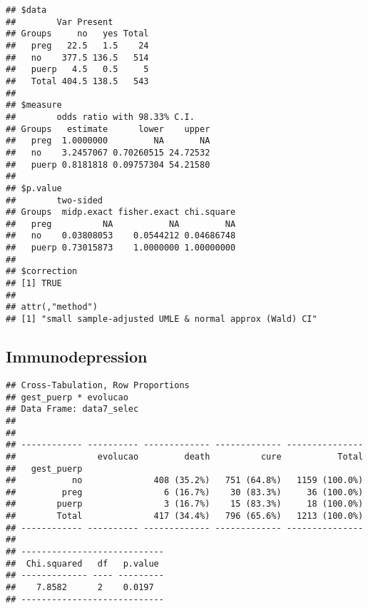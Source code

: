 \documentclass[
]{article}
\newenvironment{Shaded}{\begin{snugshade}}{\end{snugshade}}
\newcommand{\DataTypeTok}[1]{\textcolor[rgb]{0.13,0.29,0.53}{#1}}
\newcommand{\KeywordTok}[1]{\textcolor[rgb]{0.13,0.29,0.53}{\textbf{#1}}}
\newcommand{\NormalTok}[1]{#1}
\newcommand{\OperatorTok}[1]{\textcolor[rgb]{0.81,0.36,0.00}{\textbf{#1}}}
\newcommand{\OtherTok}[1]{\textcolor[rgb]{0.56,0.35,0.01}{#1}}
\newcommand{\StringTok}[1]{\textcolor[rgb]{0.31,0.60,0.02}{#1}}
\begin{document}
\begin{verbatim}
## $data
##        Var Present
## Groups     no   yes Total
##   preg   22.5   1.5    24
##   no    377.5 136.5   514
##   puerp   4.5   0.5     5
##   Total 404.5 138.5   543
## 
## $measure
##        odds ratio with 98.33% C.I.
## Groups   estimate      lower    upper
##   preg  1.0000000         NA       NA
##   no    3.2457067 0.70260515 24.72532
##   puerp 0.8181818 0.09757304 54.21580
## 
## $p.value
##        two-sided
## Groups  midp.exact fisher.exact chi.square
##   preg          NA           NA         NA
##   no    0.03808053    0.0544212 0.04686748
##   puerp 0.73015873    1.0000000 1.00000000
## 
## $correction
## [1] TRUE
## 
## attr(,"method")
## [1] "small sample-adjusted UMLE & normal approx (Wald) CI"
\end{verbatim}

\hypertarget{immunodepression}{%
\subsection{Immunodepression}\label{immunodepression}}

\begin{Shaded}
\end{Shaded}

\begin{Shaded}
\end{Shaded}

\begin{verbatim}
## Cross-Tabulation, Row Proportions  
## gest_puerp * evolucao  
## Data Frame: data7_selec  
## 
## 
## ------------ ---------- ------------- ------------- ---------------
##                evolucao         death          cure           Total
##   gest_puerp                                                       
##           no              408 (35.2%)   751 (64.8%)   1159 (100.0%)
##         preg                6 (16.7%)    30 (83.3%)     36 (100.0%)
##        puerp                3 (16.7%)    15 (83.3%)     18 (100.0%)
##        Total              417 (34.4%)   796 (65.6%)   1213 (100.0%)
## ------------ ---------- ------------- ------------- ---------------
## 
## ----------------------------
##  Chi.squared   df   p.value 
## ------------- ---- ---------
##    7.8582      2    0.0197  
## ----------------------------
\end{verbatim}
\end{document}
